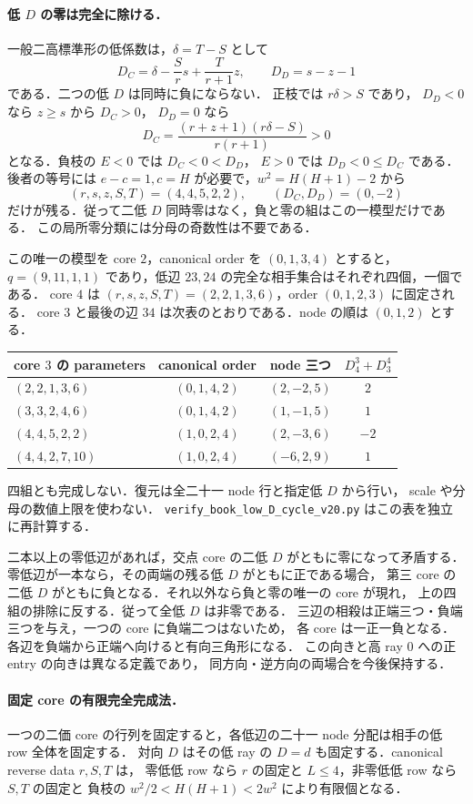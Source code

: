 \paragraph{低 $D$ の零は完全に除ける．}
一般二高標準形の低係数は，$\delta=T-S$ として
\[
 D_C=\delta-\frac Sr s+\frac T{r+1}z,\qquad D_D=s-z-1
\]
である．二つの低 $D$ は同時に負にならない．
正枝では $r\delta>S$ であり，
$D_D<0$ なら $z\ge s$ から $D_C>0$，
$D_D=0$ なら
\[
 D_C=\frac{(r+z+1)(r\delta-S)}{r(r+1)}>0
\]
となる．負枝の $E<0$ では $D_C<0<D_D$，
$E>0$ では $D_D<0\le D_C$ である．後者の等号には
$e-c=1,c=H$ が必要で，$w^2=H(H+1)-2$ から
\[
 (r,s,z,S,T)=(4,4,5,2,2),\qquad(D_C,D_D)=(0,-2)
\]
だけが残る．従って二低 $D$ 同時零はなく，負と零の組はこの一模型だけである．
この局所零分類には分母の奇数性は不要である．

この唯一の模型を core $2$，canonical order を $(0,1,3,4)$ とすると，
$q=(9,11,1,1)$ であり，低辺 $23,24$ の完全な相手集合はそれぞれ四個，一個である．
core $4$ は $(r,s,z,S,T)=(2,2,1,3,6)$，order $(0,1,2,3)$ に固定される．
core $3$ と最後の辺 $34$ は次表のとおりである．node の順は $(0,1,2)$ とする．
\begin{center}
\small
\begin{tabular}{lccc}
core $3$ の parameters&canonical order&node 三つ&$D^3_4+D^4_3$\\\hline
$(2,2,1,3,6)$&$(0,1,4,2)$&$(2,-2,5)$&$2$\\
$(3,3,2,4,6)$&$(0,1,4,2)$&$(1,-1,5)$&$1$\\
$(4,4,5,2,2)$&$(1,0,2,4)$&$(2,-3,6)$&$-2$\\
$(4,4,2,7,10)$&$(1,0,2,4)$&$(-6,2,9)$&$1$
\end{tabular}
\end{center}
四組とも完成しない．復元は全二十一 node 行と指定低 $D$ から行い，
scale や分母の数値上限を使わない．
\nolinkurl{verify_book_low_D_cycle_v20.py} はこの表を独立に再計算する．

二本以上の零低辺があれば，交点 core の二低 $D$ がともに零になって矛盾する．
零低辺が一本なら，その両端の残る低 $D$ がともに正である場合，
第三 core の二低 $D$ がともに負となる．それ以外なら負と零の唯一の core が現れ，
上の四組の排除に反する．従って全低 $D$ は非零である．
三辺の相殺は正端三つ・負端三つを与え，一つの core に負端二つはないため，
各 core は一正一負となる．各辺を負端から正端へ向けると有向三角形になる．
この向きと高 ray $0$ への正 entry の向きは異なる定義であり，
同方向・逆方向の両場合を今後保持する．

\paragraph{固定 core の有限完全完成法．}
一つの二価 core の行列を固定すると，各低辺の二十一 node 分配は相手の低 row 全体を固定する．
対向 $D$ はその低 ray の $D=d$ も固定する．canonical reverse data $r,S,T$ は，
零低低 row なら $r$ の固定と $L\le4$，非零低低 row なら $S,T$ の固定と
負枝の $w^2/2<H(H+1)<2w^2$ により有限個となる．

